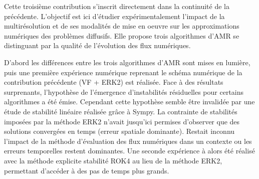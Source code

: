 Cette troisième contribution s'inscrit directement dans la continuité de la précédente.
L'objectif est ici d'étudier expérimentalement l'impact de la multirésolution et de ses modalités de mise en oeuvre 
sur les approximations numériques des problèmes diffusifs. Elle propose trois algorithmes d'AMR se distinguant
par la qualité de l’évolution des flux numériques.\par
D'abord les différences entre les trois algorithmes d'AMR sont mises en lumière, 
puis une première expérience numérique reprenant le schéma numérique de la contribution précédente (VF + ERK2) 
est réalisée. Face à des résultats surprenants, l'hypothèse de l'émergence d'instabilités résiduelles pour certains algorithmes a été émise. 
Cependant cette hypothèse semble être invalidée par une étude de stabilité linéaire réalisée grâce à Sympy.
La contrainte de stabilités imposées par la méthode ERK2 n'avait jusqu'ici permises d'observer que des solutions convergées en temps (erreur spatiale dominante).
Restait inconnu l'impact de la méthode d'évaluation des flux numériques dans un contexte ou les erreurs temporelles restent dominantes. Une seconde expérience 
à alors été réalisé avec la méthode explicite stabilité ROK4 au lieu de la méthode ERK2, permettant d'accéder à des pas de temps plus grands.